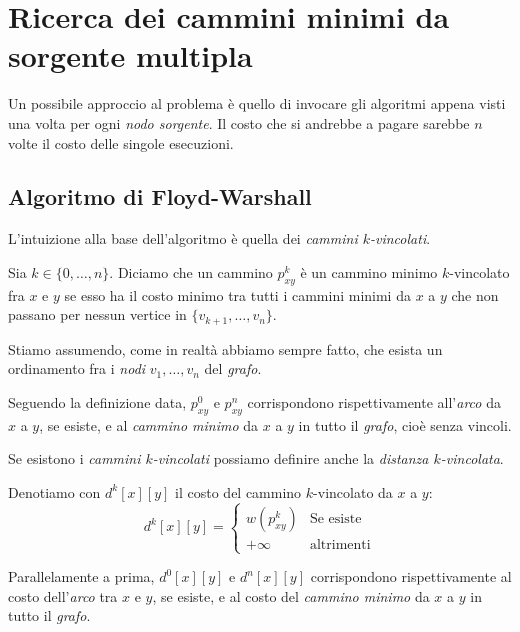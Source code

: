 \section{Ricerca dei cammini minimi da sorgente multipla}
Un possibile approccio al problema è quello di invocare gli algoritmi
appena visti una volta per ogni \emph{nodo sorgente}. Il costo che si
andrebbe a pagare sarebbe $n$ volte il costo delle singole esecuzioni.

\subsection{Algoritmo di Floyd-Warshall}
L'intuizione alla base dell'algoritmo è quella dei \emph{cammini $k$-vincolati}.

\begin{definition}
    Sia $k\in\{0,\dots,n\}$. Diciamo che un cammino $p^k_{xy}$ è un cammino
    minimo $k$-vincolato fra $x$ e $y$ se esso ha il costo minimo tra tutti i
    cammini minimi da $x$ a $y$ che non passano per nessun vertice in $\{v_{k+1},
    \dots,v_n\}$.
\end{definition}
\begin{note}
    Stiamo assumendo, come in realtà abbiamo sempre fatto, che esista un
    ordinamento fra i \emph{nodi} $v_1,\dots,v_n$ del \emph{grafo}.
\end{note}
\begin{note}
    Seguendo la definizione data, $p_{xy}^0$ e $p_{xy}^n$ corrispondono
    rispettivamente all'\emph{arco} da $x$ a $y$, se esiste, e al \emph{cammino
    minimo} da $x$ a $y$ in tutto il \emph{grafo}, cioè senza vincoli.
\end{note}

\noindent
Se esistono i \emph{cammini $k$-vincolati} possiamo definire anche la
\emph{distanza $k$-vincolata}.
\begin{definition}
    Denotiamo con $d^k[x][y]$ il costo del cammino $k$-vincolato da $x$ a $y$:
    \[d^k[x][y]=\begin{cases}
        w(p^k_{xy}) & \text{Se esiste}\\
        +\infty & \text{altrimenti}
    \end{cases}\]
\end{definition}
\begin{note}
    Parallelamente a prima, $d^0[x][y]$ e $d^n[x][y]$ corrispondono
    rispettivamente al costo dell'\emph{arco} tra $x$ e $y$, se esiste, e al
    costo del \emph{cammino minimo} da $x$ a $y$ in tutto il \emph{grafo}.
\end{note}

